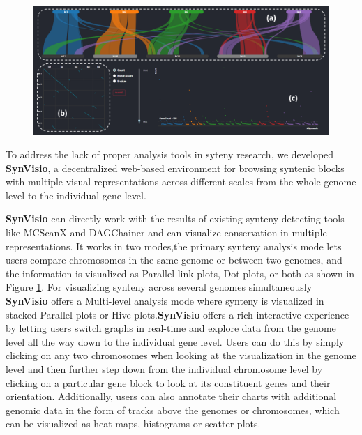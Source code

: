 \begin{figure}
  \centering
  \includegraphics[width=1\linewidth]{images/ch_1_dashboard.PNG}
  \label{fig:ch_1_dashboard}
\end{figure}

To address the lack of proper analysis tools in syteny research, we developed \textbf{SynVisio}, a decentralized web-based environment for browsing syntenic blocks with multiple visual representations across different scales from the whole genome level to the individual gene level.

\textbf{SynVisio} can directly work with the results of existing synteny detecting tools like MCScanX\cite{wang2012mcscanx} and DAGChainer\cite{haas2004dagchainer} and can visualize conservation in multiple representations. It works in two modes,the primary synteny analysis mode lets users compare chromosomes in the same genome or between two genomes, and the information is visualized as Parallel link plots, Dot plots, or both as shown in Figure \ref{fig:ch_1_dashboard}. For visualizing synteny across several genomes simultaneously \textbf{SynVisio} offers a Multi-level analysis mode where synteny is visualized in stacked Parallel plots or Hive plots.\textbf{SynVisio} offers a rich interactive experience by letting users switch graphs in real-time and explore data from the genome level all the way down to the individual gene level. Users can do this by simply clicking on any two chromosomes when looking at the visualization in the genome level and then further step down from the individual chromosome level by clicking on a particular gene block to look at its constituent genes and their orientation. Additionally, users can also annotate their charts with additional genomic data in the form of tracks above the genomes or chromosomes, which can be visualized as heat-maps, histograms or scatter-plots.



